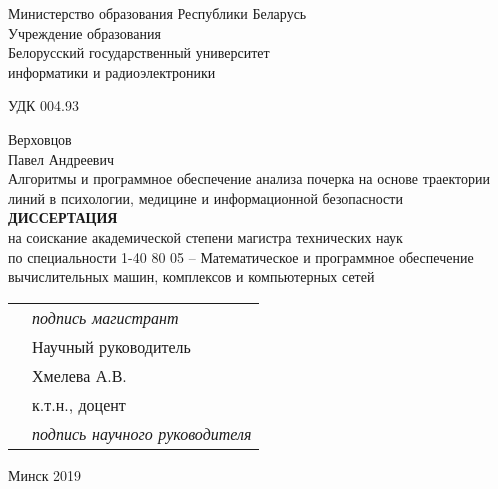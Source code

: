\begin{titlepage}
  \begin{center}
    Министерство образования Республики Беларусь\\
    Учреждение образования\\
    Белорусский государственный университет \\
    информатики и радиоэлектроники\\[1em]

    \begin{flushleft}
        УДК 004.93
    \end{flushleft}
    Верховцов \\
    Павел Андреевич \\[1em]

    Алгоритмы и программное обеспечение анализа почерка на основе траектории линий в психологии, медицине и информационной безопасности\\[2em]

    \textbf{ДИССЕРТАЦИЯ}\\
    {на соискание академической степени магистра технических наук}\\[2em]
    
    {по специальности 1-40 80 05 – Математическое и программное обеспечение вычислительных  машин, комплексов и компьютерных сетей}\\[3em]

    \begin{tabular}{ p{}p{} }
      & \emph{подпись магистрант} \\[1em]
      & Научный руководитель \\
      & Хмелева А.В.\\
      & к.т.н., доцент \\[3em]
      & \emph{подпись научного руководителя}
    \end{tabular}

    \vfill
    {\normalsize Минск 2019}
  \end{center}
\end{titlepage}
